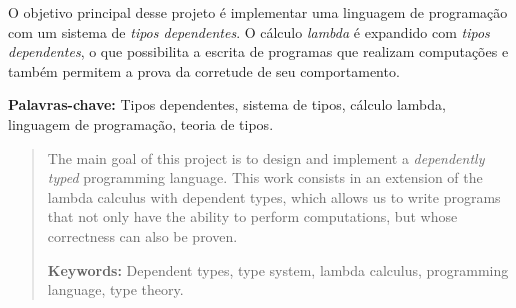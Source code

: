 \documentclass[
       embeddedlogo,
       english,
       lmodern,
       coorientadorbanca,
       noabntexcite
]{ufsc-thesis-rn46-2019}
\begin{document}

\pretextual%
\imprimircapa%
\imprimirfolhaderosto*
\imprimirfolhadecertificacao

\begin{resumo}[Resumo]
       O objetivo principal desse projeto é implementar uma linguagem de programação com um sistema de \emph{tipos dependentes}.
       O cálculo \emph{lambda} é expandido com \emph{tipos dependentes}, o que possibilita a escrita de programas que realizam computações e também permitem a prova da corretude de seu comportamento.

       \vspace{\baselineskip}
       \textbf{Palavras-chave:} Tipos dependentes, sistema de tipos, cálculo lambda, linguagem de programação, teoria de tipos.
\end{resumo}

\begin{abstract}
       The main goal of this project is to design and implement a \emph{dependently typed} programming language.
       This work consists in an extension of the lambda calculus with dependent types, which allows us to write programs that not only have the ability to perform computations, but whose correctness can also be proven.

       \vspace{\baselineskip}
       \textbf{Keywords:} Dependent types, type system, lambda calculus, programming language, type theory.
\end{abstract}

\listoffigures*
\tableofcontents*

\textual%






\postextual
\printbibliography{}
\end{document}
